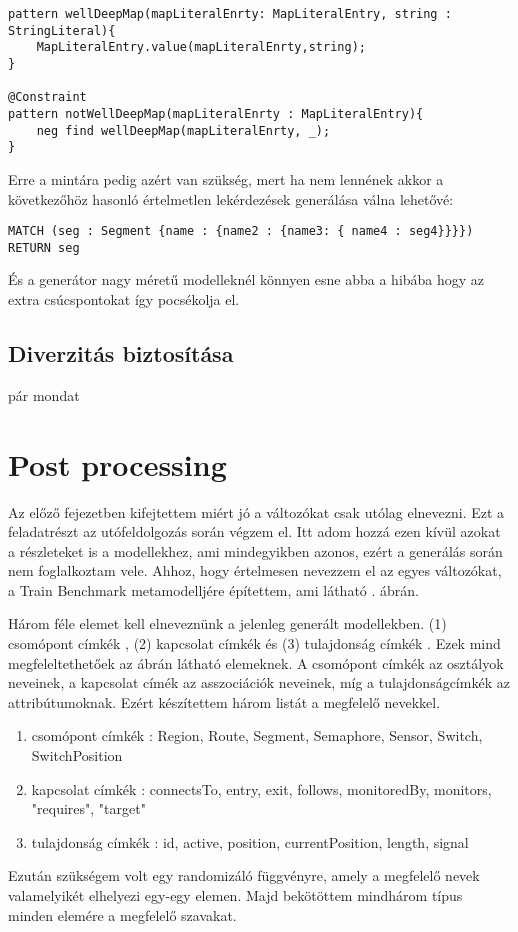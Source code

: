 \begin{lstlisting}[style=viatrasmall]
pattern wellDeepMap(mapLiteralEnrty: MapLiteralEntry, string : StringLiteral){
	MapLiteralEntry.value(mapLiteralEnrty,string);
}

@Constraint
pattern notWellDeepMap(mapLiteralEnrty : MapLiteralEntry){
	neg find wellDeepMap(mapLiteralEnrty, _);
}
\end{lstlisting}

Erre a mintára pedig azért van szükség, mert ha nem lennének akkor a következőhöz hasonló értelmetlen lekérdezések generálása válna lehetővé:

\begin{lstlisting}[style=cyphersmall]
MATCH (seg : Segment {name : {name2 : {name3: { name4 : seg4}}}}) 
RETURN seg
\end{lstlisting}

És a generátor nagy méretű modelleknél könnyen esne abba a hibába hogy az extra csúcspontokat így pocsékolja el.




\subsection{Diverzitás biztosítása}
pár mondat




\section{Post processing}
Az előző fejezetben kifejtettem miért jó  a változókat csak utólag elnevezni. Ezt a feladatrészt az utófeldolgozás során végzem el. Itt adom hozzá ezen kívül azokat a részleteket is a modellekhez, ami mindegyikben azonos, ezért a generálás során nem foglalkoztam vele. Ahhoz, hogy értelmesen nevezzem el az egyes változókat, a Train Benchmark metamodelljére építettem, ami látható . ábrán.

Három féle elemet kell elneveznünk a jelenleg generált modellekben. (1) csomópont címkék  , (2) kapcsolat címkék  és (3) tulajdonság címkék .
Ezek mind megfeleltethetőek az ábrán látható elemeknek. A csomópont címkék az osztályok neveinek, a kapcsolat címék az asszociációk neveinek, míg a tulajdonságcímkék az attribútumoknak. Ezért készítettem három listát a megfelelő nevekkel.
\begin{enumerate}
	\item csomópont címkék : Region, Route, Segment, Semaphore, Sensor, Switch, SwitchPosition
	\item kapcsolat címkék : connectsTo, entry, exit, follows, monitoredBy, monitors,
	"requires", "target"
	\item tulajdonság címkék : id, active, position, currentPosition, length, signal
	
\end{enumerate}
Ezután szükségem volt egy randomizáló függvényre, amely a megfelelő nevek valamelyikét elhelyezi egy-egy elemen.
Majd bekötöttem mindhárom típus minden elemére a megfelelő szavakat.

